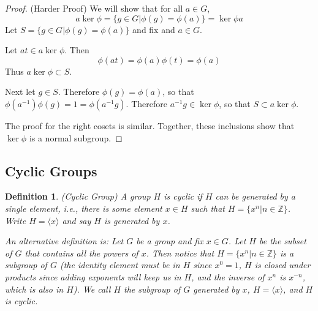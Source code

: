 \documentclass[12pt]{article}
\newtheorem{definition}{Definition}
\theoremstyle{definition}
\theoremstyle{definition}
\begin{document}
\begin{proof}(Harder Proof)
We will show that for all $a \in G$, 
\begin{equation}
	a \ker\phi = \{g \in G | \phi(g) = \phi(a) \} = \ker \phi a
\end{equation}
Let $S = \{g \in G | \phi(g) = \phi(a) \}$ and fix and $a \in G$. 

Let $at \in a \ker \phi$. Then 
\begin{equation}
	\phi(at) = \phi(a)\phi(t) = \phi(a)
\end{equation}
Thus $a \ker \phi \subset S$. 

Next let $g \in S$. Therefore $\phi(g) = \phi(a)$, so that $\phi(a^{-1}) \phi(g) = 1 = \phi(a^{-1}g)$. Therefore $a^{-1}g \in \ker \phi$, so that $S \subset a \ker\phi$. 

The proof for the right cosets is similar. Together, these inclusions show that $\ker \phi$ is a normal subgroup. 
\end{proof}

\subsection{Cyclic Groups}
\begin{definition}(Cyclic Group)
A group $H$ is cyclic if $H$ can be generated by a single element, i.e., there is some element $x \in H$ such that $H = \{x^n | n \in \mathbb{Z} \}$. Write $H  = \langle x \rangle$ and say $H$ is generated by $x$.

An alternative definition is: Let $G$ be a group and fix $x \in G$. Let $H$ be the subset of $G$ that contains all the powers of $x$. Then notice that $H = \{x^n | n \in \mathbb{Z} \}$ is a subgroup of $G$ (the identity element must be in $H$ since $x^0 = 1$, $H$ is closed under products since adding exponents will keep us in $H$, and the inverse of $x^n$ is $x^{-n}$, which is also in $H$). We call $H$ the subgroup of $G$ generated by $x$, $H = \langle x \rangle$, and $H$ is cyclic.  
\end{definition}
\end{document}
